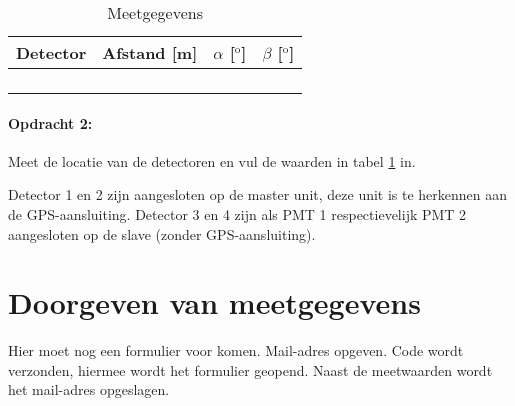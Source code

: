 \begin{table}[h]
    \centering
    \begin{tabular}{|>{\centering}p{3.5cm}|>{\centering}p{3.5cm}|>{\centering}p{3.5cm}|>{\centering}p{3.5cm}|}
        \hline 
        Detector & Afstand {[}m{]} & $\alpha$ {[}$^{\mathrm{o}}${]} & $\beta$ {[}$^{\mathrm{o}}${]}\tabularnewline
        \hline 
        \hline 
        1 &  &  & \tabularnewline
        \hline 
        2 &  &  & \tabularnewline
        \hline 
        3 &  &  & \tabularnewline
        \hline 
        4 &  &  & \tabularnewline
        \hline 
    \end{tabular}

\caption{\label{tab:Meetgegevens}Meetgegevens}
\end{table}

\paragraph{Opdracht 2:}

Meet de locatie van de detectoren en vul de waarden in tabel
\ref{tab:Meetgegevens} in.

Detector 1 en 2 zijn aangesloten op de \hisparc master unit, deze unit is
te herkennen aan de GPS-aansluiting. Detector 3 en 4 zijn als PMT 1
respectievelijk PMT 2 aangesloten op de \hisparc slave (zonder
GPS-aansluiting).


\section{Doorgeven van meetgegevens}

Hier moet nog een formulier voor komen. Mail-adres opgeven. Code wordt
verzonden, hiermee wordt het formulier geopend. Naast de meetwaarden
wordt het mail-adres opgeslagen.


